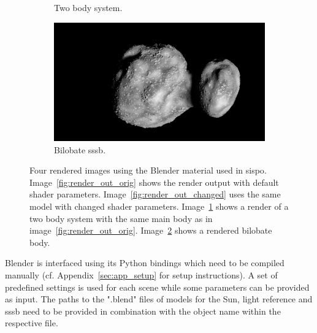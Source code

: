 \begin{figure}[htb]
\begin{subfigure}[b]{0.47\textwidth}
        \caption{Two body system.}
        \label{fig:render_out_main_moon}
    \end{subfigure}
    \begin{subfigure}[b]{0.47\textwidth}
        \centering
        \includegraphics[width=\textwidth]{doc/thesis/0_figures/procedural_terrain/bilobe2.png}
        \caption{Bilobate \gls{sssb}.}
        \label{fig:render_out_bilobe}
    \end{subfigure}
    \caption{Four rendered images using the Blender material used in \gls{sispo}. Image~\ref{fig:render_out_orig} shows the render output with default shader parameters. Image~\ref{fig:render_out_changed} uses the same model with changed shader parameters. Image~\ref{fig:render_out_main_moon} shows a render of a two body system with the same main body as in image~\ref{fig:render_out_orig}. Image~\ref{fig:render_out_bilobe} shows a rendered bilobate body.}
    \label{fig:render_out}
\end{figure}

Blender is interfaced using its Python bindings which need to be compiled manually (cf. Appendix~\ref{sec:app_setup} for setup instructions). A set of predefined settings is used for each scene while some parameters can be provided as input. The paths to the ".blend" files of models for the Sun, light reference and \gls{sssb} need to be provided in combination with the object name within the respective file.

